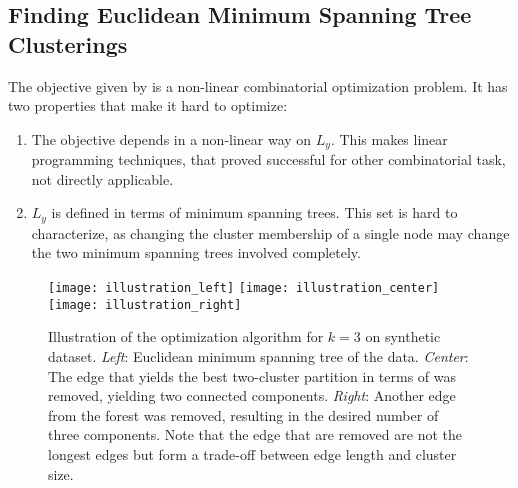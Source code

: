 \subsection{Finding Euclidean Minimum Spanning Tree Clusterings}
The objective given by  is a non-linear combinatorial
optimization problem. It has two properties that make it hard to optimize:
\begin{enumerate}
    \item The objective depends in a non-linear way on $L_y$.
        This makes linear programming techniques, that proved successful for
        other combinatorial task, not directly applicable.
    \item $L_y$ is defined in terms of minimum spanning trees. This set is hard
        to characterize, as changing the cluster membership of a single node may change
        the two minimum spanning trees involved completely.
\end{enumerate}

\begin{figure}
\centering
\texttt{[image: illustration\_left]}
\texttt{[image: illustration\_center]}
\texttt{[image: illustration\_right]}
\caption{Illustration of the optimization algorithm for $k=3$ on synthetic
dataset. \emph{Left}: Euclidean minimum spanning tree of the data.
\emph{Center}: The edge that yields the best two-cluster partition in terms of
 was removed, yielding two connected components. \emph{Right}:
Another edge from the forest was removed, resulting in the desired number of
three components. Note that the edge that are removed are not the longest edges
but form a trade-off between edge length and cluster size.}
\label{fig:illustration}
\end{figure}

